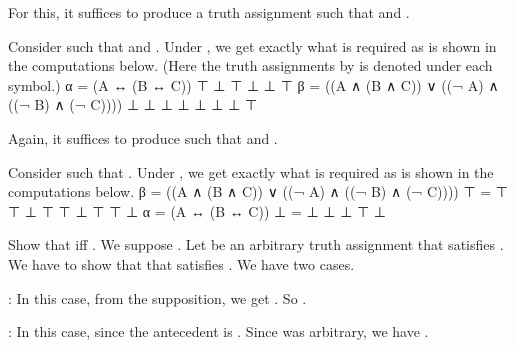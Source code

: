 		For this, it suffices to produce a truth assignment  such that  and .

		Consider  such that  and . Under , we get exactly what is required as is shown in the computations below. (Here the truth assignments by  is denoted under each symbol.)
		\startformula  \startalign[n=6, align={left, right, middle, right, middle, left}]
			\NC  α =  \NC  (A  \NC  ↔  \NC  (B  \NC  ↔  \NC  C))  \NR
			\NC  ⊤    \NC   ⊥  \NC  ⊤  \NC   ⊥  \NC  ⊥  \NC  ⊤    \NR
		\stopalign  \stopformula
		\startformula  \startalign[n=15, align={left, right, middle, middle, middle, middle, middle, right, left, middle, right, left, middle, right, left}]
			\NC  β =  \NC  ((A  \NC  ∧  \NC  (B  \NC  ∧  \NC  C))  \NC  ∨  \NC  ((¬  \NC  A)  \NC  ∧  \NC  ((¬  \NC  B)  \NC  ∧  \NC  (¬  \NC  C))))  \NR
			\NC  ⊥    \NC    ⊥  \NC  ⊥  \NC      \NC     \NC       \NC  ⊥  \NC       \NC      \NC  ⊥  \NC       \NC      \NC  ⊥  \NC   ⊥  \NC  ⊤      \NR
		\stopalign  \stopformula

		\bold{(\m{β ⊭ α})}
		Again, it suffices to produce  such that  and \m{\bar{v}(α) = ⊥}.

		Consider  such that . Under , we get exactly what is required as is shown in the computations below.
		\startformula  \startalign[n=15, align={left, right, middle, middle, middle, middle, middle, right, left, middle, right, left, middle, right, left}]
			\NC  β =  \NC  ((A  \NC  ∧  \NC  (B  \NC  ∧  \NC  C))  \NC  ∨  \NC  ((¬  \NC  A)  \NC  ∧  \NC  ((¬  \NC  B)  \NC  ∧  \NC  (¬  \NC  C))))  \NR
			\NC  ⊤ =  \NC       \NC     \NC      \NC     \NC       \NC  ⊤  \NC    ⊤  \NC  ⊥   \NC  ⊤  \NC    ⊤  \NC  ⊥   \NC  ⊤  \NC   ⊤  \NC  ⊥      \NR
		\stopalign  \stopformula
		\startformula  \startalign[n=6, align={left, right, middle, right, middle, left}]
			\NC  α =  \NC  (A  \NC  ↔  \NC  (B  \NC  ↔  \NC  C))  \NR
			\NC  ⊥ =  \NC   ⊥  \NC  ⊥  \NC   ⊥  \NC  ⊤  \NC  ⊥    \NR
		\stopalign  \stopformula
	\stopproof

	\startproposition [title={Exercise 1.2.4a}]
		Show that  iff .
	\stopproposition
	\startproof
		We suppose . Let  be an arbitrary truth assignment that satisfies . We have to show that  that satisfies . We have two cases.
		\startitemize[i, joinedup]
			\item  {}: In this case, from the supposition, we get . So .
			\item  {}: In this case,  since the antecedent is .
		\stopitemize
		Since  was arbitrary, we have .

